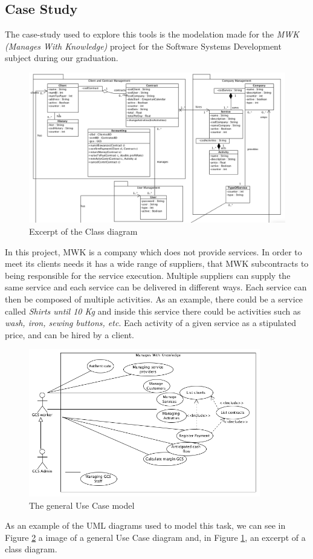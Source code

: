 \subsection*{Case Study}
The case-study used to explore this tools is the modelation made for the \textit{MWK (Manages With Knowledge)} project for the Software Systems Development subject during our graduation.

\begin{figure}[!htbp]
\begin{center}
\includegraphics[scale=0.35]{images/classbw.png}
\caption{Excerpt of the Class diagram}\label{fig:class}
\end{center}
\end{figure} 

In this project, MWK is a company which does not provide services. 
In order to meet its clients needs it has a wide range of suppliers, that MWK subcontracts to being responsible for the service execution.
Multiple suppliers can supply the same service and each  service can be delivered in different ways.
Each service can then be composed of multiple activities. As an example, there could be a service called \textit{Shirts until 10 Kg} and inside this service there could be activities such as \textit{wash, iron, sewing buttons, etc}.
Each activity of a given service as a stipulated price, and can be hired by a client.

\begin{figure}[!htbp]
\begin{center}
\includegraphics[width=0.9\textwidth]{images/usecase.png}
\caption{The general Use Case model}\label{fig:usecase}
\end{center}
\end{figure} 

As an example of the UML diagrams used to model this task, we can see in Figure \ref{fig:usecase} a image of a general Use Case diagram and, in Figure \ref{fig:class}, an excerpt of a class diagram.
